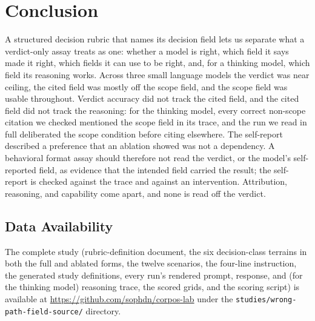 \documentclass[11pt,a4paper]{article}
\begin{document}
\section{Conclusion}

A structured decision rubric that names its decision field lets us separate what a
verdict-only assay treats as one: whether a model is right, which field it says
made it right, which fields it can use to be right, and, for a thinking model,
which field its reasoning works. Across three small language models the verdict was
near ceiling, the cited field was mostly off the scope field, and the scope field
was usable throughout. Verdict accuracy did not track the cited field, and the
cited field did not track the reasoning: for the thinking model, every correct
non-scope citation we checked mentioned the scope field in its trace, and the run
we read in full deliberated the scope condition before citing elsewhere. The
self-report described a preference that an ablation showed was not a dependency. A
behavioral format assay should therefore not read the verdict, or the model's
self-reported field, as evidence that the intended field carried the result; the
self-report is checked against the trace and against an intervention. Attribution,
reasoning, and capability come apart, and none is read off the verdict.

\subsection{Data Availability}

The complete study (rubric-definition document, the six decision-class terrains
in both the full and ablated forms, the twelve scenarios, the four-line
instruction, the generated study definitions, every run's rendered prompt,
response, and (for the thinking model) reasoning trace, the scored grids, and the
scoring script) is available at \url{https://github.com/sophdn/corpos-lab}
under the \texttt{studies/wrong-path-field-source/} directory.


\end{document}
